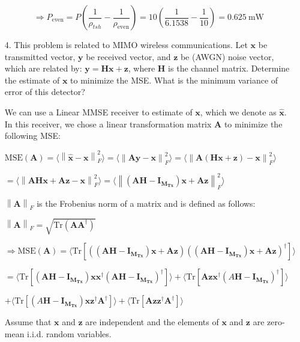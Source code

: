 \documentclass[fleqn]{article}
\newcommand{\norm}[1]{\left \lVert #1 \right \rVert}
\begin{document}
\begin{enumerate}
		\begin{equation*}
			\Rightarrow P_{\text{even}} = P\left(\frac{1}{\rho_{tsh}} - \frac{1}{\rho_{\text{even}}}\right) = 10\left(\frac{1}{6.1538} - \frac{1}{10}\right) = 0.625\ \text{mW}
		\end{equation*}		
		
		\item[4.] This problem is related to MIMO wireless communications. Let $\mathbf{x}$ be transmitted vector, $\mathbf{y}$ be received vector, and $\mathbf{z}$ be (AWGN) noise vector, which are related by: $\mathbf{y}=\mathbf{Hx} + \mathbf{z}$, where $\mathbf{H}$ is the channel matrix. Determine the estimate of $\mathbf{x}$ to minimize the MSE. What is the minimum variance of error of this detector?
		
		\pagebreak
		We can use a Linear MMSE receiver to estimate of $\mathbf{x}$, which we denote as $\mathbf{\hat{x}}$. In this receiver, we chose a linear transformation matrix $\mathbf{A}$ to minimize the following MSE:
		
		$\text{MSE}(\mathbf{A}) = \langle \norm{\mathbf{\hat{x}} - \mathbf{x}}^2_F \rangle = \langle \norm{\mathbf{Ay} - \mathbf{x}}^2_F \rangle = \langle \norm{\mathbf{A}(\mathbf{Hx} + \mathbf{z}) - \mathbf{x}}^2_F \rangle$
		
		$ = \langle \norm{\mathbf{AHx} + \mathbf{Az} - \mathbf{x}}^2_F \rangle = \langle \norm{(\mathbf{AH} - \mathbf{I_{M_{Tx}}})\mathbf{x} + \mathbf{Az}}^2_F \rangle$
		
		$\norm{\mathbf{A}}_F$ is the Frobenius norm of a matrix and is defined as follows:
		
		$\norm{\mathbf{A}}_F = \sqrt{\text{Tr}(\mathbf{AA^{\dagger}})}$
		
		$\Rightarrow \text{MSE}(\mathbf{A}) = \langle \text{Tr}[((\mathbf{AH} - \mathbf{I_{M_{Tx}}})\mathbf{x} + \mathbf{Az})((\mathbf{AH} - \mathbf{I_{M_{Tx}}})\mathbf{x} + \mathbf{Az})^{\dagger}]\rangle$
		
		$ = \langle \text{Tr}[(\mathbf{AH} - \mathbf{I_{M_{Tx}}})\mathbf{xx^{\dagger}}(\mathbf{AH} - \mathbf{I_{M_{Tx}}})^{\dagger}] \rangle + \langle \text{Tr}[\mathbf{Azx^{\dagger}}(A\mathbf{H} - \mathbf{I_{M_{Tx}}})^{\dagger}] \rangle$
		
		$ + \langle \text{Tr}[(A\mathbf{H} - \mathbf{I_{M_{Tx}}})\mathbf{xz^{\dagger}A^{\dagger}}] \rangle + \langle \text{Tr}[\mathbf{Azz^{\dagger}A^{\dagger}}] \rangle$
		
		Assume that $\mathbf{x}$ and $\mathbf{z}$ are independent and the elements of $\mathbf{x}$ and $\mathbf{z}$ are zero-mean i.i.d. random variables.
		

\end{enumerate}
\end{document}
